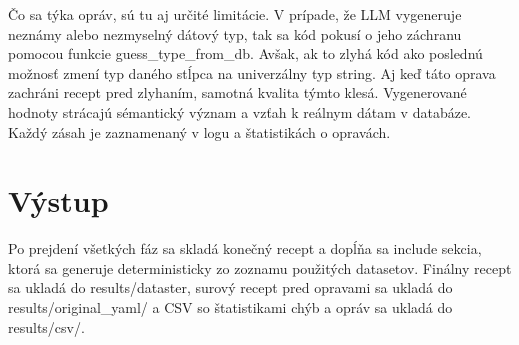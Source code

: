 



Čo sa týka opráv, sú tu aj určité limitácie. V prípade, že LLM vygeneruje neznámy alebo nezmyselný dátový typ, tak sa kód pokusí o jeho záchranu pomocou funkcie guess\_type\_from\_db. Avšak, ak to zlyhá kód ako poslednú možnosť zmení typ daného stĺpca na univerzálny typ string. Aj keď táto oprava zachráni recept pred zlyhaním, samotná kvalita týmto klesá. Vygenerované hodnoty strácajú sémantický význam a vzťah k reálnym dátam v databáze. Každý zásah je zaznamenaný v logu a štatistikách o opravách.

\section{Výstup}
Po prejdení všetkých fáz sa skladá konečný recept a dopĺňa sa include sekcia, ktorá sa generuje deterministicky zo zoznamu použitých datasetov. Finálny recept sa ukladá do results/dataster, surový recept pred opravami sa ukladá do results/original\_yaml/ a CSV so štatistikami chýb a opráv sa ukladá do results/csv/.

